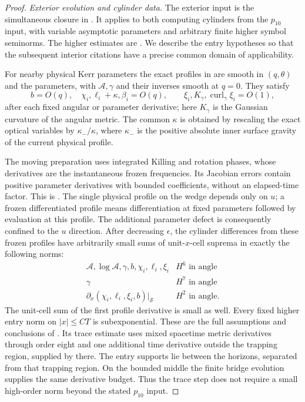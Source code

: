 \begin{proof}
\emph{Exterior evolution and cylinder data.}
The exterior input is the simultaneous closure in
\cite[]{Foundation}.  It applies
to both computing cylinders from the $p_{10}$ input, with variable
asymptotic parameters and arbitrary finite higher symbol seminorms.
The higher estimates are
\cite[]{Foundation}.
We describe the entry hypotheses so that the subsequent interior
citations have a precise common domain of applicability.

For nearby physical Kerr parameters the exact profiles in
\cite[]{Foundation} are smooth in
$(q,\theta)$ and the parameters, with $\mathcal A,\gamma$ and their
inverses smooth at $q=0$.  They satisfy
\[
 b=O(q),\quad \chi_i,\ell_i+\kappa,\beta_i=O(q),
 \qquad \xi_i,K_\gamma,\operatorname{curl}_\gamma\xi_i=O(1),
\]
after each fixed angular or parameter derivative; here $K_\gamma$ is
the Gaussian curvature of the angular metric. The common $\kappa$ is obtained by rescaling the exact optical variables by
$\kappa_-/\kappa$, where $\kappa_-$ is the positive absolute inner
surface gravity of the current physical profile.

The moving preparation uses integrated Killing and rotation phases,
whose derivatives are the instantaneous frozen frequencies.  Its
Jacobian errors contain positive parameter derivatives with bounded
coefficients, without an elapsed-time factor.  This is
\cite[]{Foundation}.
The single physical profile on the wedge depends only on $u$;
a frozen differentiated profile means differentiation at fixed
parameters followed by evaluation at this profile.  The additional
parameter defect is consequently confined to the $u$ direction.
After decreasing $\epsilon$, the cylinder differences from these
frozen profiles have arbitrarily small sums of unit-$x$-cell suprema
in exactly the following norms:
\begin{equation}\label{bg:entry-orders}
\begin{array}{c|c}
 \mathcal A,\log\mathcal A,\gamma,b,\chi_i,\ell_i,\xi_i&H^6\text{ in angle}\\
 \gamma&H^7\text{ in angle}\\
 \partial_x(\chi_i,\ell_i,\xi_i,b)|_{\mathcal S}&H^2\text{ in angle}.
\end{array}
\end{equation}
The unit-cell sum of the first profile derivative is small as well.
Every fixed higher entry norm on $|x|\le CT$ is subexponential.
These are the full assumptions and conclusions of
\cite[]{Foundation}.
Its trace estimate uses mixed spacetime metric derivatives through
order eight and one additional time derivative outside the trapping
region, supplied by  there.  The entry supports lie between the
horizons, separated from that trapping region.  On the bounded middle
the finite bridge evolution supplies the same derivative budget.
Thus the trace step does not require a small high-order norm beyond
the stated $p_{10}$ input.


\end{proof}
